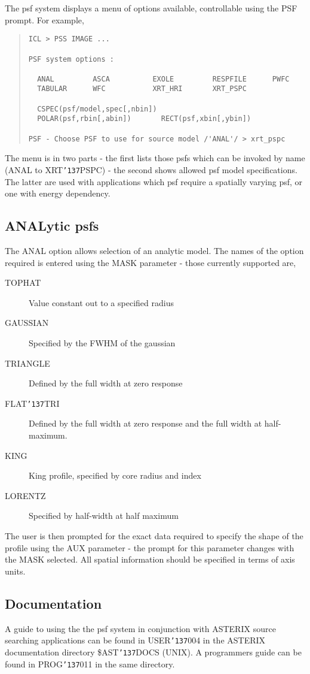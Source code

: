 \documentclass{book}
\renewcommand{\_}{{\tt\char'137}}     %
\begin{document}
The psf system displays a menu of options available, controllable
using the PSF prompt. For example,

\begin{quote}\begin{verbatim}
ICL > PSS IMAGE ...

PSF system options :

  ANAL         ASCA          EXOLE         RESPFILE      PWFC
  TABULAR      WFC           XRT_HRI       XRT_PSPC

  CSPEC(psf/model,spec[,nbin])
  POLAR(psf,rbin[,abin])       RECT(psf,xbin[,ybin])

PSF - Choose PSF to use for source model /'ANAL'/ > xrt_pspc
\end{verbatim}\end{quote}
The menu is in two parts - the first lists those psfs which can
be invoked by name (ANAL to XRT\_PSPC) - the second shows allowed
psf model specifications. The latter are used with applications
which psf require a spatially varying psf, or one with energy
dependency.

\subsection{ANALytic psfs}
The ANAL option allows selection of an analytic model. The names of
the option required is entered using the MASK parameter - those
currently supported are,


\begin{description}
\item[TOPHAT]
Value constant out to a specified radius
\item[GAUSSIAN]
Specified by the FWHM of the gaussian
\item[TRIANGLE]
Defined by the full width at zero response
\item[FLAT\_TRI]
Defined by the full width at zero response and the
full width at half-maximum.
\item[KING]
King profile, specified by core radius and index
\item[LORENTZ]
Specified by half-width at half maximum
\end{description}
The user is then prompted for the exact data required to specify the
shape of the profile using the AUX parameter - the prompt for this
parameter changes with the MASK selected. All spatial information
should be specified in terms of axis units.

\subsection{Documentation}
A guide to using the the psf system in conjunction with ASTERIX
source searching applications can be found in USER\_004 in the
ASTERIX documentation directory \$AST\_DOCS (UNIX). A programmers
guide can be found in PROG\_011 in the same directory.
\end{document}
